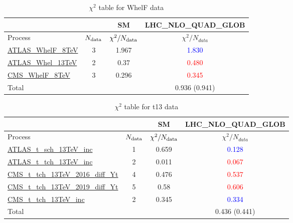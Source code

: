 \documentclass{article}
\begin{document}
\begin{table}[H]
\centering
\begin{tabular}{|l|c|c|c|}
\hline
 \multicolumn{2}{|c|}{} & SM& LHC_NLO_QUAD_GLOB\\ \hline
Process & $N_{\rm data}$ & $\chi^ 2/N_{\rm data}$& $\chi^ 2/N_{data}$\\ \hline
\href{https://arxiv.org}{ATLAS_WhelF_8TeV} & 3 & 1.967 & \textcolor{blue}                            {1.830} \\ \hline
\href{https://arxiv.org}{ATLAS_Whel_13TeV} & 2 & 0.37 & \textcolor{red}                            {0.480} \\ \hline
\href{https://arxiv.org}{CMS_WhelF_8TeV} & 3 & 0.296 & \textcolor{red}                            {0.345} \\ \hline
\hline Total & &  & 0.936 (0.941) \\ \hline
\end{tabular}
\caption{$\chi^2$ table for WhelF data}
\end{table}
\begin{table}[H]
\centering
\begin{tabular}{|l|c|c|c|}
\hline
 \multicolumn{2}{|c|}{} & SM& LHC_NLO_QUAD_GLOB\\ \hline
Process & $N_{\rm data}$ & $\chi^ 2/N_{\rm data}$& $\chi^ 2/N_{data}$\\ \hline
\href{https://arxiv.org}{ATLAS_t_sch_13TeV_inc} & 1 & 0.659 & \textcolor{blue}                            {0.128} \\ \hline
\href{https://arxiv.org}{ATLAS_t_tch_13TeV_inc} & 2 & 0.011 & \textcolor{red}                            {0.067} \\ \hline
\href{https://arxiv.org}{CMS_t_tch_13TeV_2016_diff_Yt} & 4 & 0.476 & \textcolor{red}                            {0.537} \\ \hline
\href{https://arxiv.org}{CMS_t_tch_13TeV_2019_diff_Yt} & 5 & 0.58 & \textcolor{red}                            {0.606} \\ \hline
\href{https://arxiv.org}{CMS_t_tch_13TeV_inc} & 2 & 0.345 & \textcolor{blue}                            {0.334} \\ \hline
\hline Total & &  & 0.436 (0.441) \\ \hline
\end{tabular}
\caption{$\chi^2$ table for t13 data}
\end{table}
\end{document}
